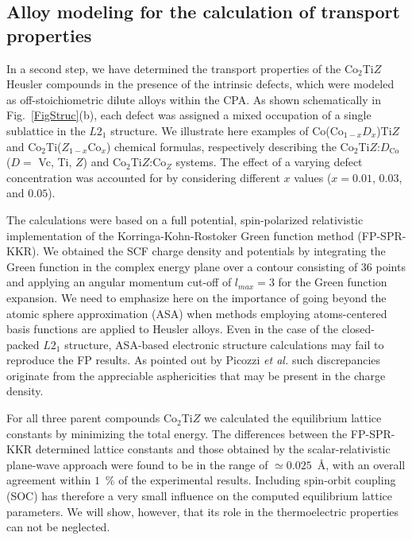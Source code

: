 \documentclass[aps,prb,twocolumn,superscriptaddress,showpacs]{revtex4}
\newcommand{\FG}[1]{Fig.~\ref{#1}}
\newcommand{\ea}{{\it et al.}}
\begin{document}
\subsection{Alloy modeling for the calculation of 
               transport properties}\label{SecCPA}

In a second step, we have determined the 
transport properties of the Co$_2$Ti$Z$ Heusler 
compounds in the presence of the intrinsic defects,
which were modeled as off-stoichiometric dilute alloys
within the CPA.\cite{Sov67,Tay67,Sov70}
As shown schematically in \FG{FigStruc}(b), 
each defect was assigned a mixed occupation of a single
sublattice in the $L2_1$ structure. We illustrate here
examples of Co(Co$_{1-x}$$D_x$)Ti$Z$ and 
Co$_2$Ti($Z_{1-x}$Co$_x$) chemical formulas,
respectively describing the
Co$_2$Ti$Z$:$D_\text{Co}$ ($D=$ Vc, Ti, $Z$)
and Co$_2$Ti$Z$:Co$_Z$ systems. The effect of a
varying defect concentration was accounted for
by considering different $x$ values
($x=0.01$, $0.03$, and $0.05$).

The calculations were based on a 
full potential, spin-polarized
relativistic implementation of the
Korringa-Kohn-Rostoker Green function method 
(FP-SPR-KKR).\cite{EKM11,EBKM16,SPR-KKR}
We obtained the SCF charge density and potentials
by integrating the Green function in the complex energy 
plane over a contour consisting of 36 points and
applying an angular momentum cut-off of
$l_{max}=3$ for the Green function expansion.
We need to emphasize here on the importance of
going beyond the atomic sphere approximation (ASA) when 
methods employing atoms-centered basis functions are
applied to Heusler alloys. 
Even in the case of the closed-packed $L2_1$ structure,
ASA-based electronic structure calculations may fail
to reproduce the FP results.\cite{PCF02,KKW+07}
As pointed out by Picozzi \ea\cite{PCF02}
such discrepancies originate from the
appreciable asphericities that may be 
present in the charge density.\cite{FPvsASAnote}

For all three parent compounds Co$_2$Ti$Z$ 
we calculated the equilibrium lattice constants by
minimizing the total energy. The differences 
between the FP-SPR-KKR determined lattice constants
and those obtained by the scalar-relativistic
plane-wave approach were found to be 
in the range of $\simeq 0.025$~\AA,
with an overall agreement within $1$~\% of the
experimental results.\cite{WZ73,CSP+96,BFB+10}
Including spin-orbit coupling (SOC) has therefore
a very small influence on the computed equilibrium
lattice parameters. We will show, however, that
its role in the thermoelectric properties 
can not be neglected.
\end{document}
